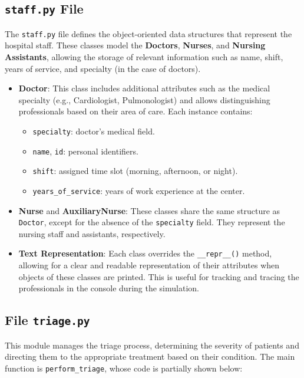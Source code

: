 \documentclass[a4paper,12pt]{article}
\begin{document}
\subsection{\texttt{staff.py} File}

The \texttt{staff.py} file defines the object-oriented data structures that represent the hospital staff. These classes model the \textbf{Doctors}, \textbf{Nurses}, and \textbf{Nursing Assistants}, allowing the storage of relevant information such as name, shift, years of service, and specialty (in the case of doctors).

\begin{itemize}
    \item \textbf{Doctor}: This class includes additional attributes such as the medical specialty (e.g., Cardiologist, Pulmonologist) and allows distinguishing professionals based on their area of care. Each instance contains:
    \begin{itemize}
        \item \texttt{specialty}: doctor's medical field.
        \item \texttt{name}, \texttt{id}: personal identifiers.
        \item \texttt{shift}: assigned time slot (morning, afternoon, or night).
        \item \texttt{years\_of\_service}: years of work experience at the center.
    \end{itemize}
    
    \item \textbf{Nurse} and \textbf{AuxiliaryNurse}: These classes share the same structure as \texttt{Doctor}, except for the absence of the \texttt{specialty} field. They represent the nursing staff and assistants, respectively.

    \item \textbf{Text Representation}: Each class overrides the \texttt{\_\_repr\_\_()} method, allowing for a clear and readable representation of their attributes when objects of these classes are printed. This is useful for tracking and tracing the professionals in the console during the simulation.
\end{itemize}

\subsection{File \texttt{triage.py}}

This module manages the triage process, determining the severity of patients and directing them to the appropriate treatment based on their condition. The main function is \texttt{perform\_triage}, whose code is partially shown below:
\end{document}
